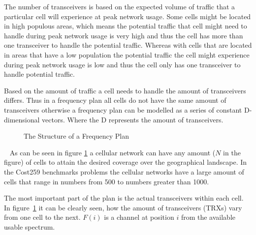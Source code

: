 The number of transceivers is based on the expected volume of traffic that a particular cell will experience at peak network usage. Some cells might be located in high populous areas, which means the potential traffic that cell might need to handle during peak network usage is very high and thus the cell has more than one transceiver to handle the potential traffic. Whereas with cells that are located in areas that have a low population the potential traffic the cell might experience during peak network usage is low and thus the cell only has one transceiver to handle potential traffic.

Based on the amount of traffic a cell needs to handle the amount of transceivers differs. Thus in a frequency plan all cells do not have the same amount of transceivers otherwise a frequency plan can be modelled as a series of constant D-dimensional vectors. Where the D represents the amount of transceivers. 
~
\begin{figure}[ht]
	\centering
	\setlength \fboxsep{0pt}
	\setlength \fboxrule{0.5pt}
	\caption{The Structure of a Frequency Plan}
	\label{fig:fapPlan}
\end{figure}
~
As can be seen in figure \ref{fig:fapPlan} a cellular network can have any amount ($N$ in the figure) of cells to attain the desired coverage over the geographical landscape. In the Cost259 benchmarks problems the cellular networks have a large amount of cells that range in numbers from 500 to numbers greater than 1000. 

The most important part of the plan is the actual transceivers within each cell. In figure~\ref{fig:fapPlan} it can be clearly seen, how the amount of transceivers (TRXs) vary from one cell to the next. $F(i)$ is a channel at position $i$ from the available usable spectrum. 

